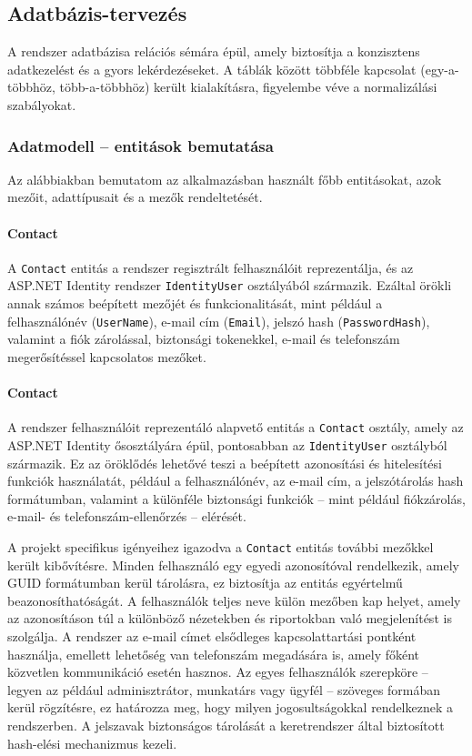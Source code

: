\subsection{Adatbázis-tervezés}

\indent A rendszer adatbázisa relációs sémára épül, amely biztosítja a konzisztens adatkezelést és a gyors lekérdezéseket. A táblák között többféle kapcsolat (egy-a-többhöz, több-a-többhöz) került kialakításra, figyelembe véve a normalizálási szabályokat.
\newpage
\subsubsection{Adatmodell – entitások bemutatása}

Az alábbiakban bemutatom az alkalmazásban használt főbb entitásokat, azok mezőit, adattípusait és a mezők rendeltetését.

\paragraph{Contact}

A \texttt{Contact} entitás a rendszer regisztrált felhasználóit reprezentálja, és az ASP.NET Identity rendszer \texttt{IdentityUser} osztályából származik. Ezáltal örökli annak számos beépített mezőjét és funkcionalitását, mint például a felhasználónév (\texttt{UserName}), e-mail cím (\texttt{Email}), jelszó hash (\texttt{PasswordHash}), valamint a fiók zárolással, biztonsági tokenekkel, e-mail és telefonszám megerősítéssel kapcsolatos mezőket.

\paragraph{Contact}

A rendszer felhasználóit reprezentáló alapvető entitás a \texttt{Contact} osztály, amely az ASP.NET Identity ősosztályára épül, pontosabban az \texttt{IdentityUser} osztályból származik. Ez az öröklődés lehetővé teszi a beépített azonosítási és hitelesítési funkciók használatát, például a felhasználónév, az e-mail cím, a jelszótárolás hash formátumban, valamint a különféle biztonsági funkciók – mint például fiókzárolás, e-mail- és telefonszám-ellenőrzés – elérését.

A projekt specifikus igényeihez igazodva a \texttt{Contact} entitás további mezőkkel került kibővítésre. Minden felhasználó egy egyedi azonosítóval rendelkezik, amely GUID formátumban kerül tárolásra, ez biztosítja az entitás egyértelmű beazonosíthatóságát. A felhasználók teljes neve külön mezőben kap helyet, amely az azonosításon túl a különböző nézetekben és riportokban való megjelenítést is szolgálja. A rendszer az e-mail címet elsődleges kapcsolattartási pontként használja, emellett lehetőség van telefonszám megadására is, amely főként közvetlen kommunikáció esetén hasznos. Az egyes felhasználók szerepköre – legyen az például adminisztrátor, munkatárs vagy ügyfél – szöveges formában kerül rögzítésre, ez határozza meg, hogy milyen jogosultságokkal rendelkeznek a rendszerben. A jelszavak biztonságos tárolását a keretrendszer által biztosított hash-elési mechanizmus kezeli.

